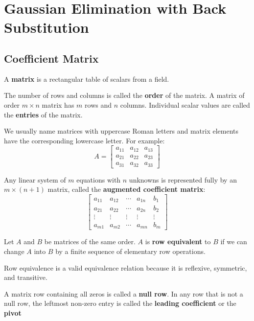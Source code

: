 
\section{Gaussian Elimination with Back Substitution}

\subsection{Coefficient Matrix}
\begin{definition}[Matrix]\label{def:matrix}
    A \textbf{matrix} is a rectangular table of scalars from a field.

    The number of rows and columns is called the \textbf{order} of the matrix. A matrix of order $m \times n$ matrix has $m$ rows and $n$ columns. Individual scalar values are called the \textbf{entries} of the matrix.
\end{definition}
\begin{notation}
    We usually name matrices with uppercase Roman letters and matrix elements have the corresponding lowercase letter.
    For example:
    \[
        A = \begin{bmatrix}
            a_{11} & a_{12} & a_{13} \\
            a_{21} & a_{22} & a_{23} \\
            a_{31} & a_{32} & a_{33}
        \end{bmatrix}
    \]
\end{notation}
\begin{definition*}\label{def:augmented-coefficient-matrix}
    Any linear system of $m$ equations with $n$ unknowns is represented fully by an $m \times \left(n+1\right)$ matrix, called the \textbf{augmented coefficient matrix}:
    \[
        \begin{bmatrix}
            a_{11} & a_{12} & \cdots & a_{1n} & b_1 \\
            a_{21} & a_{22} & \cdots & a_{2n} & b_2 \\
            \vdots & \vdots &  \vdots  & \vdots & \vdots \\
            a_{m1} & a_{m2} & \cdots & a_{mn} & b_m
        \end{bmatrix}
    \]
\end{definition*}

\begin{definition}\label{def:row-equivalent}
    Let $A$ and $B$ be matrices of the same order. $A$ is \textbf{row equivalent} to $B$ if we can change $A$ into $B$ by a finite sequence of elementary row operations.
\end{definition}
\begin{note}
    Row equivalence is a valid equivalence relation because it is reflexive, symmetric, and transitive.
\end{note}
\begin{definition}[Pivot]\label{def:pivot}
    A matrix row containing all zeros is called a \textbf{null row}. In any row that is not a null row, the leftmost non-zero entry is called the \textbf{leading coefficient} or the \textbf{pivot}
\end{definition}

